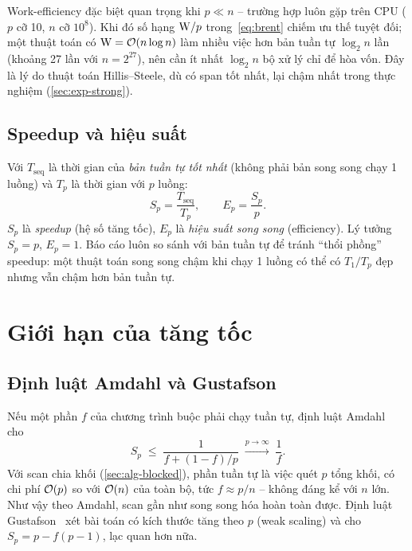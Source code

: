 Work-efficiency đặc biệt quan trọng khi \(p \ll n\) -- trường hợp luôn gặp trên CPU (\(p\) cỡ
10, \(n\) cỡ \(10^8\)). Khi đó số hạng \(\mathrm{W}/p\) trong~\eqref{eq:brent} chiếm ưu thế
tuyệt đối; một thuật toán có \(\mathrm{W} = \mathcal{O}(n \log n)\) làm nhiều việc hơn bản tuần tự
\(\log_2 n\) lần (khoảng 27 lần với \(n = 2^{27}\)), nên cần ít nhất \(\log_2 n\) bộ xử lý chỉ để
hòa vốn. Đây là lý do thuật toán Hillis--Steele, dù có span tốt nhất, lại chậm nhất trong thực
nghiệm (\cref{sec:exp-strong}).

\subsection{Speedup và hiệu suất}

Với \(T_{\text{seq}}\) là thời gian của \emph{bản tuần tự tốt nhất} (không phải bản song song
chạy 1 luồng) và \(T_p\) là thời gian với \(p\) luồng:
\begin{equation}
  S_p = \frac{T_{\text{seq}}}{T_p}, \qquad E_p = \frac{S_p}{p}.
  \label{eq:speedup}
\end{equation}
\(S_p\) là \emph{speedup} (hệ số tăng tốc), \(E_p\) là \emph{hiệu suất song song} (efficiency).
Lý tưởng \(S_p = p\), \(E_p = 1\). Báo cáo luôn so sánh với bản tuần tự để tránh ``thổi phồng''
speedup: một thuật toán song song chậm khi chạy 1 luồng có thể có \(T_1/T_p\) đẹp nhưng vẫn chậm
hơn bản tuần tự.

\section{Giới hạn của tăng tốc}
\label{sec:laws}

\subsection{Định luật Amdahl và Gustafson}

Nếu một phần \(f\) của chương trình buộc phải chạy tuần tự, định luật
Amdahl~\cite{amdahl1967} cho
\begin{equation}
  S_p \;\le\; \frac{1}{f + (1-f)/p} \;\xrightarrow{p\to\infty}\; \frac{1}{f}.
  \label{eq:amdahl}
\end{equation}
Với scan chia khối (\cref{sec:alg-blocked}), phần tuần tự là việc quét \(p\) tổng khối, có chi
phí \(\mathcal{O}(p)\) so với \(\mathcal{O}(n)\) của toàn bộ, tức \(f \approx p/n\) -- không đáng kể với \(n\) lớn.
Như vậy theo Amdahl, scan gần như song song hóa hoàn toàn được. Định luật
Gustafson~\cite{gustafson1988} xét bài toán có kích thước tăng theo \(p\) (weak scaling) và cho
\(S_p = p - f(p-1)\), lạc quan hơn nữa.

